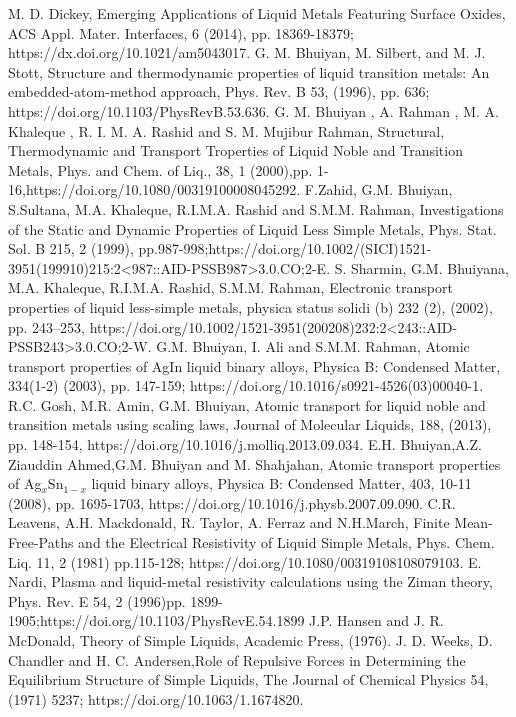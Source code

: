 \documentclass[final,12pt]{elsarticle}
\begin{document}
{\begin{thebibliography}{thesis}
	M. D. Dickey, Emerging Applications of Liquid Metals Featuring Surface Oxides, ACS Appl. Mater. Interfaces, 6 (2014), pp. 18369-18379; https://dx.doi.org/10.1021/am5043017. 
	G. M. Bhuiyan, M. Silbert, and M. J. Stott, Structure and thermodynamic properties of liquid transition metals: An embedded-atom-method approach, Phys. Rev. B 53, (1996), pp. 636; https://doi.org/10.1103/PhysRevB.53.636.
	G. M. Bhuiyan , A. Rahman , M. A. Khaleque , R. I. M. A. Rashid and S. M. Mujibur Rahman, Structural, Thermodynamic and Transport Troperties of Liquid Noble and Transition Metals, Phys. and Chem. of Liq., 38, 1 (2000),pp. 1-16,https://doi.org/10.1080/00319100008045292.
	F.Zahid, G.M. Bhuiyan, S.Sultana, M.A. Khaleque, R.I.M.A. Rashid and S.M.M. Rahman, Investigations of the Static and Dynamic Properties of Liquid Less Simple Metals, Phys. Stat. Sol. B 215, 2 (1999), pp.987-998;https://doi.org/10.1002/(SICI)1521-3951(199910)215:2<987::AID-PSSB987>3.0.CO;2-E.
	S. Sharmin, G.M. Bhuiyana, M.A. Khaleque, R.I.M.A. Rashid, S.M.M. Rahman, Electronic transport properties of liquid less-simple metals, physica status solidi (b) 232 (2), (2002), pp. 243–253, https://doi.org/10.1002/1521-3951(200208)232:2<243::AID-PSSB243>3.0.CO;2-W.
	G.M. Bhuiyan, I. Ali and S.M.M. Rahman, Atomic transport properties of AgIn liquid binary alloys, Physica B: Condensed Matter, 334(1-2) (2003), pp. 147-159; https://doi.org/10.1016/s0921-4526(03)00040-1.
	R.C. Gosh, M.R. Amin, G.M. Bhuiyan, Atomic transport for liquid noble and transition metals using scaling laws, Journal of Molecular Liquids, 188, (2013), pp. 148-154, https://doi.org/10.1016/j.molliq.2013.09.034.
	E.H. Bhuiyan,A.Z. Ziauddin Ahmed,G.M. Bhuiyan and M. Shahjahan, Atomic transport properties of Ag$_x$Sn$_{1-x}$ liquid binary alloys, Physica B: Condensed Matter, 403, 10-11 (2008), pp. 1695-1703, https://doi.org/10.1016/j.physb.2007.09.090.
	C.R. Leavens, A.H. Mackdonald, R. Taylor, A. Ferraz and N.H.March, Finite Mean-Free-Paths and the Electrical Resistivity of Liquid Simple Metals, Phys. Chem. Liq. 11, 2 (1981) pp.115-128; https://doi.org/10.1080/00319108108079103.
	E. Nardi, Plasma and liquid-metal resistivity calculations using the Ziman theory, Phys. Rev. E 54, 2 (1996)pp. 1899-1905;https://doi.org/10.1103/PhysRevE.54.1899
	J.P. Hansen and J. R. McDonald, Theory of Simple Liquids, Academic Press, (1976).
	J. D. Weeks, D. Chandler and H. C. Andersen,Role of Repulsive Forces in Determining the Equilibrium Structure of Simple Liquids, The Journal of Chemical Physics 54, (1971) 5237; https://doi.org/10.1063/1.1674820.

\end{thebibliography}}
\end{document}
